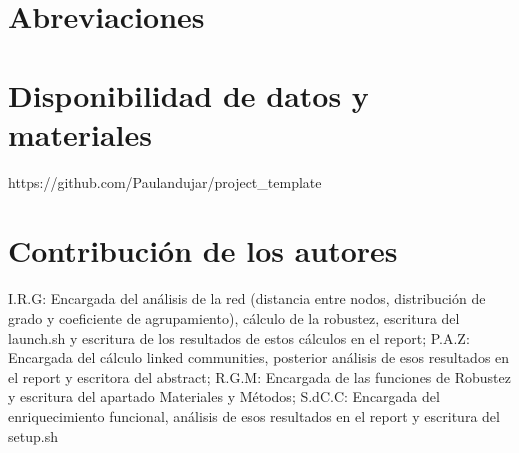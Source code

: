 \documentclass{bmcart}
\begin{document}
	
	
	
	
	
	
	
	
	
	
	\begin{backmatter}
	
		\section*{Abreviaciones}%
			
		
		\section*{Disponibilidad de datos y materiales}%
			https://github.com/Paulandujar/project\_template
		
		\section*{Contribución de los autores}
			I.R.G: Encargada del análisis de la red (distancia entre nodos, distribución de grado y coeficiente de agrupamiento), cálculo de la robustez, escritura del launch.sh y escritura de los resultados de estos cálculos en el report; P.A.Z: Encargada del cálculo linked communities, posterior análisis de esos resultados en el report y escritora del abstract; R.G.M: Encargada de las funciones de Robustez y escritura del apartado Materiales y Métodos; S.dC.C: Encargada del enriquecimiento funcional, análisis de esos resultados en el report y escritura del setup.sh 
		
		
		
	
	\end{backmatter}
\end{document}
